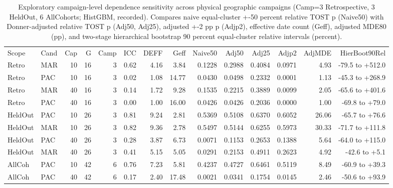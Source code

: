 \begin{table}[!ht]
\centering\footnotesize\setlength{\tabcolsep}{2.2pt}
\caption{Exploratory campaign-level dependence sensitivity across physical geographic campaigns (Camp=3 Retrospective, 3 HeldOut, 6 AllCohorts; HistGBM, recorded). Compares naive equal-cluster +-50 percent relative TOST p (Naive50) with Donner-adjusted relative TOST p (Adj50, Adj25), adjusted +-2 pp p (Adjp2), effective date count (Geff), adjusted MDE80 (pp), and two-stage hierarchical bootstrap 90 percent equal-cluster relative intervals (percent).}
\begin{tabular}{llrrrrrrrrrrrr}
\hline
Scope & Cand & Cap & G & Camp & ICC & DEFF & Geff & Naive50 & Adj50 & Adj25 & Adjp2 & AdjMDE & HierBoot90Rel \\
Retro & MAR & 10 & 16 & 3 & 0.62 & 4.16 & 3.84 & 0.1228 & 0.2988 & 0.4084 & 0.0971 & 4.93 & -79.5 to +512.0 \\
Retro & PAC & 10 & 16 & 3 & 0.02 & 1.08 & 14.77 & 0.0430 & 0.0498 & 0.2332 & 0.0001 & 1.13 & -45.3 to +268.9 \\
Retro & MAR & 40 & 16 & 3 & 0.14 & 1.72 & 9.28 & 0.1535 & 0.2215 & 0.3889 & 0.0099 & 2.05 & -65.6 to +401.6 \\
Retro & PAC & 40 & 16 & 3 & 0.00 & 1.00 & 16.00 & 0.0426 & 0.0426 & 0.2036 & 0.0000 & 1.00 & -69.8 to +79.0 \\
HeldOut & PAC & 10 & 26 & 3 & 0.81 & 9.24 & 2.81 & 0.5369 & 0.5108 & 0.6370 & 0.6052 & 26.06 & -65.7 to +76.6 \\
HeldOut & MAR & 10 & 26 & 3 & 0.82 & 9.36 & 2.78 & 0.5497 & 0.5144 & 0.6255 & 0.5973 & 30.33 & -71.7 to +111.8 \\
HeldOut & PAC & 40 & 26 & 3 & 0.28 & 3.87 & 6.73 & 0.0071 & 0.1153 & 0.2653 & 0.1388 & 5.64 & -64.0 to +115.0 \\
HeldOut & MAR & 40 & 26 & 3 & 0.41 & 5.15 & 5.05 & 0.0291 & 0.2153 & 0.4911 & 0.2623 & 4.92 & -42.6 to +5.1 \\
AllCoh & PAC & 10 & 42 & 6 & 0.76 & 7.23 & 5.81 & 0.4237 & 0.4727 & 0.6461 & 0.5119 & 8.49 & -60.9 to +39.3 \\
AllCoh & PAC & 40 & 42 & 6 & 0.17 & 2.40 & 17.48 & 0.0021 & 0.0341 & 0.1754 & 0.0145 & 2.46 & -50.6 to +93.9 \\
\hline
\end{tabular}
\end{table}
